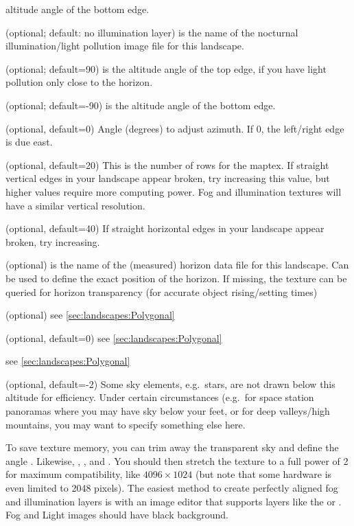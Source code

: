 \begin{description}
  altitude angle of the bottom edge.
\item[\var{maptex\_illum}] (optional; default: no illumination layer)
  is the name of the nocturnal illumination/light pollution image file
  for this landscape.
\item[\var{maptex\_illum\_top}] (optional; default=90) is the altitude
  angle of the top edge, if you have light pollution only close to the
  horizon.
\item[\var{maptex\_illum\_bottom}] (optional; default=-90) is the
  altitude angle of the bottom edge.
\item[\var{angle\_rotatez}] (optional, default=0) Angle (degrees) to
  adjust azimuth. If 0, the left/right edge is due east.
\item[\var{tesselate\_rows}] (optional, default=20) This is the number
  of rows for the maptex. If straight vertical edges in your landscape
  appear broken, try increasing this value, but higher values require
  more computing power. Fog and illumination textures will have a
  similar vertical resolution.
\item[\var{tesselate\_cols}] (optional, default=40) If straight
  horizontal edges in your landscape appear broken, try increasing.
\item[\var{polygonal\_horizon\_list}] (optional) is the name of the
  (measured) horizon data file for this landscape. Can be used to
  define the exact position of the horizon. If missing, the texture
  can be queried for horizon transparency (for accurate object
  rising/setting times)
\item[\var{polygonal\_horizon\_list\_mode}] (optional) see \ref{sec:landscapes:Polygonal}
\item[\var{polygonal\_angle\_rotatez}] (optional, default=0) see \ref{sec:landscapes:Polygonal}
\item[\var{minimal\_brightness}]  see \ref{sec:landscapes:Polygonal}
\item[\var{minimal\_altitude}] (optional, default=-2)  Some sky
  elements, e.g.\ stars, are not drawn below this altitude for
  efficiency. Under certain circumstances (e.g.\ for space station
  panoramas where you may have sky below your feet, or for deep
  valleys/high mountains, you may want to specify something else
  here.
\end{description}
%
To save texture memory, %
you can trim away the transparent
sky and define the angle . Likewise,
, ,  and
. You should then stretch the texture to a
full power of 2 for maximum compatibility, like $4096\times1024$ (but note that some hardware is
even limited to 2048 pixels). The easiest method to create perfectly
aligned fog and illumination layers is with an image editor that
supports layers like the  or . Fog
and Light images should have black background.


